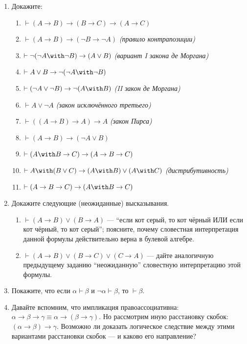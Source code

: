 \documentclass[10pt,a4paper,oneside]{article}
\begin{document}
\begin{enumerate}
\item Докажите:
\begin{enumerate}
\item $\vdash (A \rightarrow B) \rightarrow (B \rightarrow C) \rightarrow (A \rightarrow C)$ 
\item $\vdash (A \rightarrow B) \rightarrow (\neg B \rightarrow \neg A)$ \emph{(правило контрапозиции)}
\item $\vdash \neg (\neg A \with \neg B) \rightarrow (A \vee B)$ \emph{(вариант I закона де Моргана)}
\item $\vdash A \vee B \rightarrow \neg(\neg A \with \neg B)$
\item $\vdash (\neg A \vee \neg B) \rightarrow \neg (A \with B)$ \emph{(II закон де Моргана)}
\item $\vdash A \vee \neg A$ \emph{(закон исключённого третьего)}
\item $\vdash ((A \rightarrow B) \rightarrow A)\rightarrow A$ \emph{(закон Пирса)}
\item $\vdash (A \rightarrow B) \rightarrow (\neg A \vee B)$
\item $\vdash (A \with B \rightarrow C) \rightarrow (A \rightarrow B \rightarrow C)$
\item $\vdash A \with (B \vee C) \rightarrow (A \with B) \vee (A \with C)$ \emph{(дистрибутивность)}
\item $\vdash (A \rightarrow B \rightarrow C) \rightarrow (A \with B \rightarrow C)$
\end{enumerate}

\item Докажите следующие (неожиданные) высказывания.
\begin{enumerate}
\item $\vdash (A \rightarrow B) \vee (B \rightarrow A)$ --- ``если кот серый, то кот чёрный ИЛИ если кот чёрный, то кот серый''; поясните,
почему словестная интерпретация данной формулы действительно верна в булевой алгебре.
\item $\vdash (A \rightarrow B) \vee (B \rightarrow C) \vee (C \rightarrow A)$ --- дайте аналогичную предыдущему заданию ``неожиданную'' 
словестную интерпретацию этой формулы.
\end{enumerate}

\item Покажите, что если $\alpha \vdash \beta$ и $\neg\alpha\vdash\beta$, то $\vdash\beta$.

\item Давайте вспомним, что импликация правоассоциативна: $\alpha\rightarrow\beta\rightarrow\gamma \equiv \alpha\rightarrow(\beta\rightarrow\gamma)$.
Но рассмотрим иную расстановку скобок: $(\alpha\rightarrow\beta)\rightarrow\gamma$. Возможно ли доказать логическое следствие
между этими вариантами расстановки скобок --- и каково его направление?


\end{enumerate}
\end{document}
